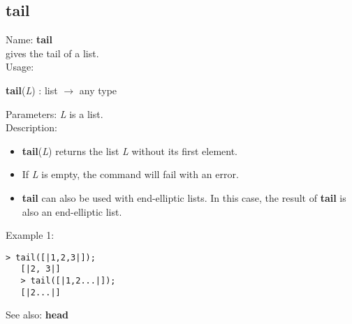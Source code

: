 \subsection{ tail }
\noindent Name: \textbf{tail}\\
gives the tail of a list.\\

\noindent Usage: 
\begin{center}
\textbf{tail}(\emph{L}) : \textsf{list} $\rightarrow$ \textsf{any type}\\
\end{center}
Parameters: 
\emph{L} is a list.\\

\noindent Description: \begin{itemize}

\item \textbf{tail}(\emph{L}) returns the list \emph{L} without its first element.

\item If \emph{L} is empty, the command will fail with an error.

\item \textbf{tail} can also be used with end-elliptic lists. In this case, the result of
   \textbf{tail} is also an end-elliptic list.
\end{itemize}
\noindent Example 1: 
\begin{center}\begin{minipage}{14.8cm}\begin{Verbatim}[frame=single]
   > tail([|1,2,3|]);
   [|2, 3|]
   > tail([|1,2...|]);
   [|2...|]
\end{Verbatim}
\end{minipage}\end{center}
See also: \textbf{head}
